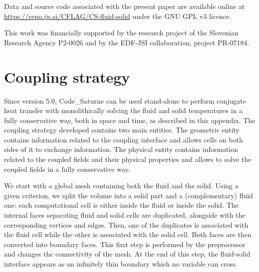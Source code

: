 \documentclass{svjour3}                     %
\begin{document}
Data and source code associated with the present paper are available online at \url{https://repo.ijs.si/CFLAG/CS-fluid-solid} under the GNU GPL v3 licence.

\begin{acknowledgements}
This work was financially supported by the research project of the Slovenian Research Agency P2-0026 and by the EDF-JSI collaboration, project PR-07184.
\end{acknowledgements}


\appendix

\section{Coupling strategy}
\label{sec-coupl_strat}

Since version 5.0, {\selectfont Code\_Saturne} can be used stand-alone to perform conjugate heat transfer with monolithically solving the fluid and solid temperatures in a fully conservative way, both in space and time, as described in this appendix.
The coupling strategy developed contains two main entities.
The geometric entity contains information related to the coupling interface and allows cells on both sides of it to exchange information.
The physical entity contains information related to the coupled fields and their physical properties and allows to solve the coupled fields in a fully conservative way.

We start with a global mesh containing both the fluid and the solid.
Using a given criterion, we split the volume into a solid part and a (complementary) fluid one: each computational cell is either inside the fluid or inside the solid.
The internal faces separating fluid and solid cells are duplicated, alongside with the corresponding vertices and edges.
Then, one of the duplicates is associated with the fluid cell while the other is associated with the solid cell.
Both faces are then converted into boundary faces.
This first step is performed by the preprocessor and changes the connectivity of the mesh.
At the end of this step, the fluid-solid interface appears as an infinitely thin boundary which no variable can cross.
\end{document}
